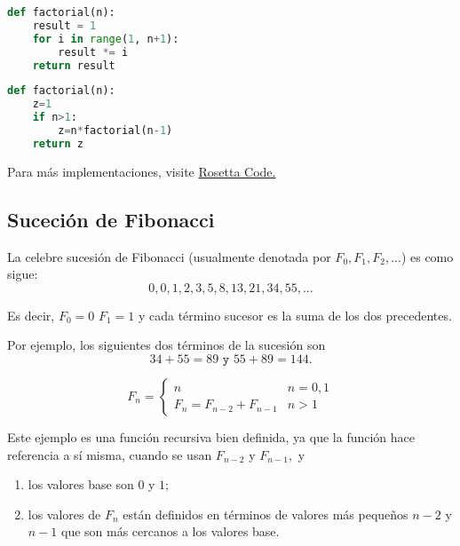 \begin{lstlisting}[language=python, caption=Implementación iterativa del \emph{factorial} en \texttt{Python}]
def factorial(n):
	result = 1
	for i in range(1, n+1):
		result *= i
	return result
\end{lstlisting}

\begin{lstlisting}[language=python, caption=Implementación recursiva del \emph{factorial} en \texttt{Python}]
def factorial(n):
	z=1
	if n>1:
		z=n*factorial(n-1)
	return z
\end{lstlisting}

Para más implementaciones, visite \href{https://rosettacode.org/wiki/Factorial}{Rosetta Code.}



\subsection{Suceción de Fibonacci}


	La celebre sucesión de Fibonacci (usualmente denotada por $F_{0}, F_{1}, F_{2},...$) es como sigue:
	$$
	0,0,1,2,3,5,8,13,21,34,55,...
	$$
	
	Es decir, $F_{0}=0$  $F_{1}=1$ y cada t\'ermino sucesor es la suma de los dos precedentes.



	Por ejemplo, los siguientes dos t\'erminos de la sucesión son
	$$34+55=89 \texttt{ y }55+89=144.$$



	\begin{definicion}
		$$
		F_{n}=
		\begin{cases}
			n & n=0,1 \\
			F_{n}=F_{n-2}+F_{n-1} & n>1
		\end{cases}
		$$
	\end{definicion}



	Este ejemplo es una función recursiva bien definida, ya que la función hace referencia a sí misma, cuando se usan $ F_{n-2}$ y $F_{n-1},$ y
	\begin{enumerate}
		\item los valores base son $0$ y $1;$
		\item los valores de $F_{n}$ están definidos en t\'erminos de valores más peque\~nos $n-2$ y $n-1$ que son más cercanos a los valores base.
	\end{enumerate}
	


